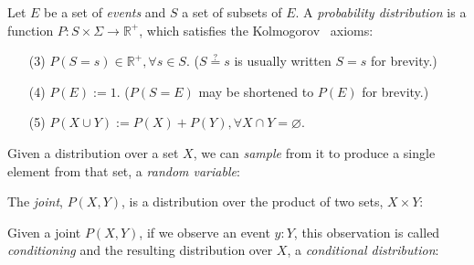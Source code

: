 \documentclass[11pt]{article}
\begin{document}
    \noindent Let $E$ be a set of \textit{events} and $S$ a set of subsets of $E$. A \textit{probability distribution} is a function $P: S \times \Sigma \rightarrow \mathbb{R}^{+}$, which satisfies the Kolmogorov~\cite{kolmogorov1933grundbegriffe} axioms:

    \begin{itemize}
        \itemsep-1em
        \item [(3)] $P(S = s) \in \mathbb{R}^{+}, \forall s \in S$. ($S \overset{?}{=} s$ is usually written $S = s$ for brevity.) \\
        \item [(4)] $P(E) := 1$. ($P(S = E)$ may be shortened to $P(E)$ for brevity.) \\
        \item [(5)] $P(X \cup Y) := P(X) + P(Y), \forall X \cap Y = \varnothing$.
    \end{itemize}

    \noindent Given a distribution over a set $X$, we can \textit{sample} from it to produce a single element from that set, a \textit{random variable}:

\begin{prooftree}
\end{prooftree}

%

\noindent The \textit{joint}, $P(X, Y)$, is a distribution over the product of two sets, $X \times Y$:

\begin{prooftree}
\end{prooftree}

\noindent Given a joint $P(X, Y)$, if we observe an event $y: Y$, this observation is called \textit{conditioning} and the resulting distribution over $X$, a \textit{conditional distribution}:

\begin{prooftree}
\end{prooftree}
\end{document}
